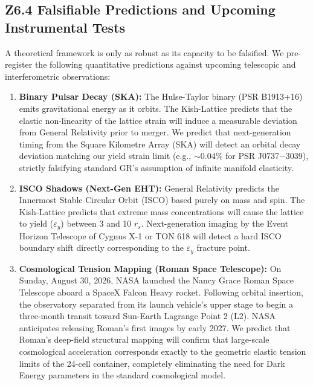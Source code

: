 \documentclass[11pt, letterpaper, openany]{book}
\begin{document}
\subsection*{Z6.4 Falsifiable Predictions and Upcoming Instrumental Tests}

A theoretical framework is only as robust as its capacity to be falsified. We pre-register the following quantitative predictions against upcoming telescopic and interferometric observations:

\begin{enumerate}
    \item \textbf{Binary Pulsar Decay (SKA):} The Hulse-Taylor binary (PSR B1913+16) emits gravitational energy as it orbits. The Kish-Lattice predicts that the elastic non-linearity of the lattice strain will induce a measurable deviation from General Relativity prior to merger. We predict that next-generation timing from the Square Kilometre Array (SKA) will detect an orbital decay deviation matching our yield strain limit (e.g., $\sim 0.04\%$ for PSR J0737−3039), strictly falsifying standard GR's assumption of infinite manifold elasticity.
    
    \item \textbf{ISCO Shadows (Next-Gen EHT):} General Relativity predicts the Innermost Stable Circular Orbit (ISCO) based purely on mass and spin. The Kish-Lattice predicts that extreme mass concentrations will cause the lattice to yield ($\varepsilon_y$) between 3 and 10 $r_s$. Next-generation imaging by the Event Horizon Telescope of Cygnus X-1 or TON 618 will detect a hard ISCO boundary shift directly corresponding to the $\varepsilon_y$ fracture point.
    
    \item \textbf{Cosmological Tension Mapping (Roman Space Telescope):} On Sunday, August 30, 2026, NASA launched the Nancy Grace Roman Space Telescope aboard a SpaceX Falcon Heavy rocket. Following orbital insertion, the observatory separated from its launch vehicle's upper stage to begin a three-month transit toward Sun-Earth Lagrange Point 2 (L2). NASA anticipates releasing Roman's first images by early 2027. We predict that Roman's deep-field structural mapping will confirm that large-scale cosmological acceleration corresponds exactly to the geometric elastic tension limits of the 24-cell container, completely eliminating the need for Dark Energy parameters in the standard cosmological model.
\end{enumerate}
\end{document}
